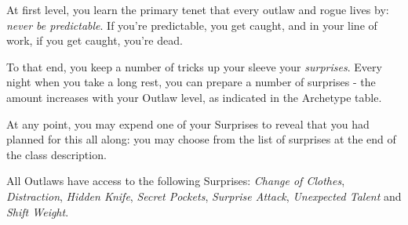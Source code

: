 
At first level, you learn the primary tenet that every outlaw and rogue lives by: {\it never be predictable}. If you're predictable, you get caught, and in your line of work, if you get caught, you're dead.

To that end, you keep a number of tricks up your sleeve \minus{} your {\it surprises}. Every night when you take a long rest, you can prepare a number of surprises - the amount increases with your Outlaw level, as indicated in the Archetype table. 

At any point, you may expend one of your Surprises to reveal that you had planned for this all along: you may choose from the list of surprises at the end of the class description. 

All Outlaws have access to the following Surprises: {\it Change of Clothes}, {\it Distraction}, {\it Hidden Knife}, {\it Secret Pockets}, {\it Surprise Attack}, {\it Unexpected Talent} and {\it Shift Weight}.

